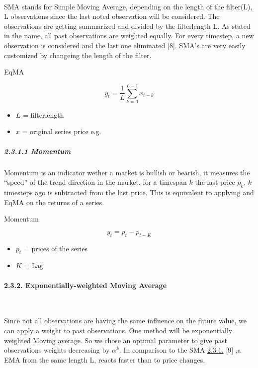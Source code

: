 \documentclass[
]{article}
\providecommand{\tightlist}{%
  \setlength{\itemsep}{0pt}\setlength{\parskip}{0pt}}
\begin{document}
~

SMA stands for Simple Moving Average, depending on the length of the
filter(L), L observations since the last noted observation will be
considered. The observations are getting summarized and divided by the
filterlength L. As stated in the name, all past observations are
weighted equally. For every timestep, a new observation is considered
and the last one eliminated {[}8{]}. SMA's are very easily customized by
changeing the length of the filter.

EqMA

\begin{equation}
  \label{eq:eqma}
  y_{t}=\frac{1}{L}\sum_{k=0}^{L-1}x_{t-k}
\end{equation}

\begin{itemize}
\tightlist
\item
  \({L}\) = filterlength
\item
  \({x}\) = original series price e.g.
\end{itemize}

\hypertarget{momentum}{%
\subparagraph{2.3.1.1 Momentum}\label{momentum}}

Momentum is an indicator wether a market is bullish or bearish, it
measures the ``speed'' of the trend direction in the market. for a
timespan \(k\) the last price \(p_k\), \(k\) timesteps ago is subtracted
from the last price. This is equivalent to applying and EqMA on the
returns of a series.

Momentum

\begin{equation}
  \label{eq:momentum}
  y_{t}=p_t - p_{t-K}
\end{equation}

\begin{itemize}
\tightlist
\item
  \({p_t}\) = prices of the series
\item
  \({K}\) = Lag
\end{itemize}

\newpage

\hypertarget{exponentially-weighted-moving-average}{%
\paragraph{2.3.2. Exponentially-weighted Moving
Average}\label{exponentially-weighted-moving-average}}

~

Since not all observations are having the same influence on the future
value, we can apply a weight to past observations. One method will be
exponentially weighted Moving average. So we chose an optimal parameter
to give past observations weights decreasing by \(\alpha^{k}\). In
comparison to the SMA \protect\hyperlink{SMA}{2.3.1.} {[}9{]} ,a EMA
from the same length L, reacts faster than to price changes.
\end{document}
